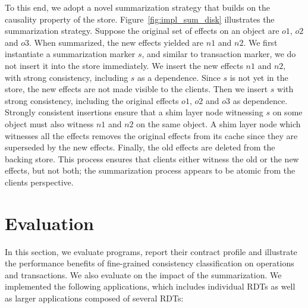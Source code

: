 To this end, we adopt a novel summarization strategy that builds on the
causality property of the store. Figure~\ref{fig:impl_sum_disk} illustrates the
summarization strategy. Suppose the original set of effects on an object are
$o1$, $o2$ and $o3$. When summarized, the new effects yielded are $n1$ and $n2$.
We first instantiate a summarization marker $s$, and similar to transaction
marker, we do not insert it into the store immediately. We insert the new
effects $n1$ and $n2$, with strong consistency, including $s$ as a dependence.
Since $s$ is not yet in the store, the new effects are not made visible to the
clients. Then we insert $s$ with strong consistency, including the original
effects $o1$, $o2$ and $o3$ as dependence. Strongly consistent insertions
ensure that a shim layer node witnessing $s$ on some object must also witness
$n1$ and $n2$ on the same object. A shim layer node which witnesses all the
effects removes the original effects from its cache since they are superseded
by the new effects. Finally, the old effects are deleted from the backing
store. This process ensures that clients either witness the old or the new
effects, but not both; the summarization process appears to be atomic from the
clients perspective.

\section{Evaluation}
\label{q_sec:results}

In this section, we evaluate \quelea programs, report their contract profile
and illustrate the performance benefits of fine-grained consistency
classification on operations and transactions. We also evaluate on the impact
of the summarization. We implemented the following applications, which includes
individual RDTs as well as larger applications composed of several RDTs:

